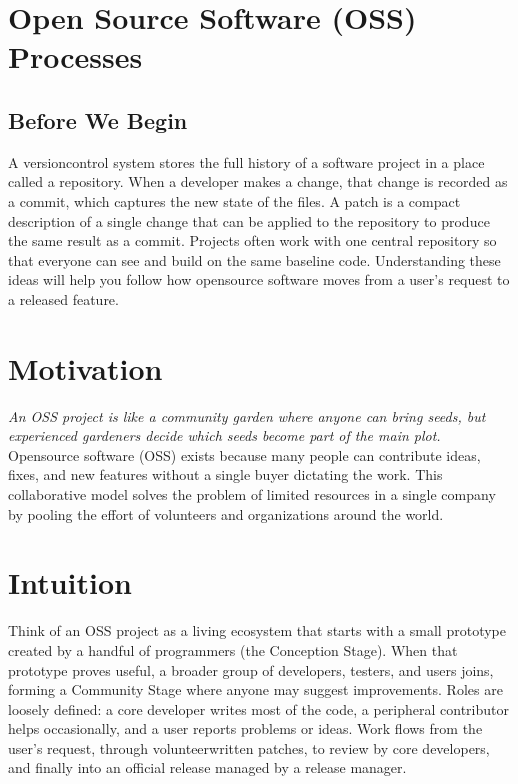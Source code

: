 \documentclass[12pt, a4paper]{article}
\begin{document}
\newpage

\section{Open Source Software (OSS) Processes}

\subsection{Before We Begin}
A versioncontrol system stores the full history of a software project in a place called a repository.  
When a developer makes a change, that change is recorded as a commit, which captures the new state of the files.  
A patch is a compact description of a single change that can be applied to the repository to produce the same result as a commit.  
Projects often work with one central repository so that everyone can see and build on the same baseline code.  
Understanding these ideas will help you follow how opensource software moves from a user's request to a released feature.  

\section{Motivation}
\emph{An OSS project is like a community garden where anyone can bring seeds, but experienced gardeners decide which seeds become part of the main plot.}  
Opensource software (OSS) exists because many people can contribute ideas, fixes, and new features without a single buyer dictating the work.  
This collaborative model solves the problem of limited resources in a single company by pooling the effort of volunteers and organizations around the world.  

\section{Intuition}
Think of an OSS project as a living ecosystem that starts with a small prototype created by a handful of programmers (the Conception Stage).  
When that prototype proves useful, a broader group of developers, testers, and users joins, forming a Community Stage where anyone may suggest improvements.  
Roles are loosely defined: a core developer writes most of the code, a peripheral contributor helps occasionally, and a user reports problems or ideas.  
Work flows from the user's request, through volunteerwritten patches, to review by core developers, and finally into an official release managed by a release manager.  
\end{document}
